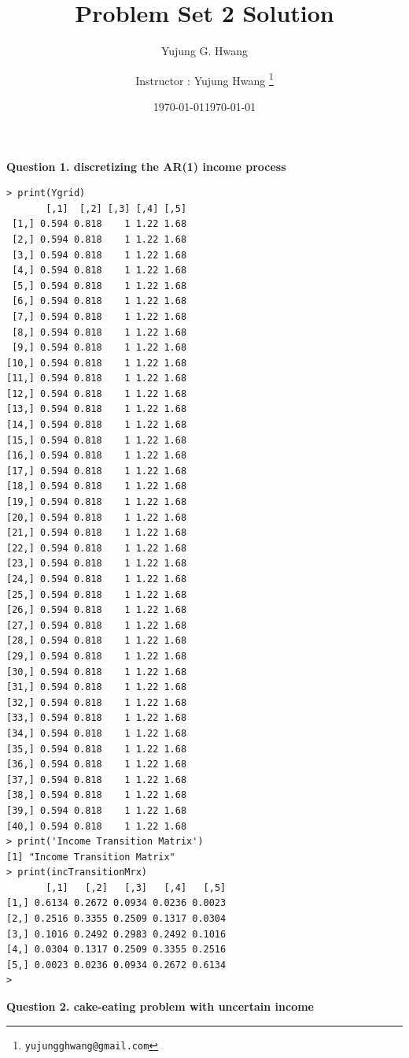 \documentclass[paper=a4, fontsize=13pt]{extarticle} %
\author{Yujung G. Hwang} %
\date{\today} %
\numberwithin{equation}{section} %
\numberwithin{figure}{section} %
\numberwithin{table}{section} %
\begin{document}
\title{	
\normalfont \normalsize 
\huge Problem Set 2 Solution
}
\author{
Instructor : Yujung Hwang \thanks{\texttt{yujungghwang@gmail.com}}} %
\date{\today} %
\maketitle %

\upshape \mdseries 

\normalsize
\textbf{Question 1. discretizing the AR(1) income process} \\

\begin{lstlisting}
> print(Ygrid)
       [,1]  [,2] [,3] [,4] [,5]
 [1,] 0.594 0.818    1 1.22 1.68
 [2,] 0.594 0.818    1 1.22 1.68
 [3,] 0.594 0.818    1 1.22 1.68
 [4,] 0.594 0.818    1 1.22 1.68
 [5,] 0.594 0.818    1 1.22 1.68
 [6,] 0.594 0.818    1 1.22 1.68
 [7,] 0.594 0.818    1 1.22 1.68
 [8,] 0.594 0.818    1 1.22 1.68
 [9,] 0.594 0.818    1 1.22 1.68
[10,] 0.594 0.818    1 1.22 1.68
[11,] 0.594 0.818    1 1.22 1.68
[12,] 0.594 0.818    1 1.22 1.68
[13,] 0.594 0.818    1 1.22 1.68
[14,] 0.594 0.818    1 1.22 1.68
[15,] 0.594 0.818    1 1.22 1.68
[16,] 0.594 0.818    1 1.22 1.68
[17,] 0.594 0.818    1 1.22 1.68
[18,] 0.594 0.818    1 1.22 1.68
[19,] 0.594 0.818    1 1.22 1.68
[20,] 0.594 0.818    1 1.22 1.68
[21,] 0.594 0.818    1 1.22 1.68
[22,] 0.594 0.818    1 1.22 1.68
[23,] 0.594 0.818    1 1.22 1.68
[24,] 0.594 0.818    1 1.22 1.68
[25,] 0.594 0.818    1 1.22 1.68
[26,] 0.594 0.818    1 1.22 1.68
[27,] 0.594 0.818    1 1.22 1.68
[28,] 0.594 0.818    1 1.22 1.68
[29,] 0.594 0.818    1 1.22 1.68
[30,] 0.594 0.818    1 1.22 1.68
[31,] 0.594 0.818    1 1.22 1.68
[32,] 0.594 0.818    1 1.22 1.68
[33,] 0.594 0.818    1 1.22 1.68
[34,] 0.594 0.818    1 1.22 1.68
[35,] 0.594 0.818    1 1.22 1.68
[36,] 0.594 0.818    1 1.22 1.68
[37,] 0.594 0.818    1 1.22 1.68
[38,] 0.594 0.818    1 1.22 1.68
[39,] 0.594 0.818    1 1.22 1.68
[40,] 0.594 0.818    1 1.22 1.68
> print('Income Transition Matrix')
[1] "Income Transition Matrix"
> print(incTransitionMrx)
       [,1]   [,2]   [,3]   [,4]   [,5]
[1,] 0.6134 0.2672 0.0934 0.0236 0.0023
[2,] 0.2516 0.3355 0.2509 0.1317 0.0304
[3,] 0.1016 0.2492 0.2983 0.2492 0.1016
[4,] 0.0304 0.1317 0.2509 0.3355 0.2516
[5,] 0.0023 0.0236 0.0934 0.2672 0.6134
> 
\end{lstlisting}


\textbf{Question 2. cake-eating problem with uncertain income} \\
\end{document}
